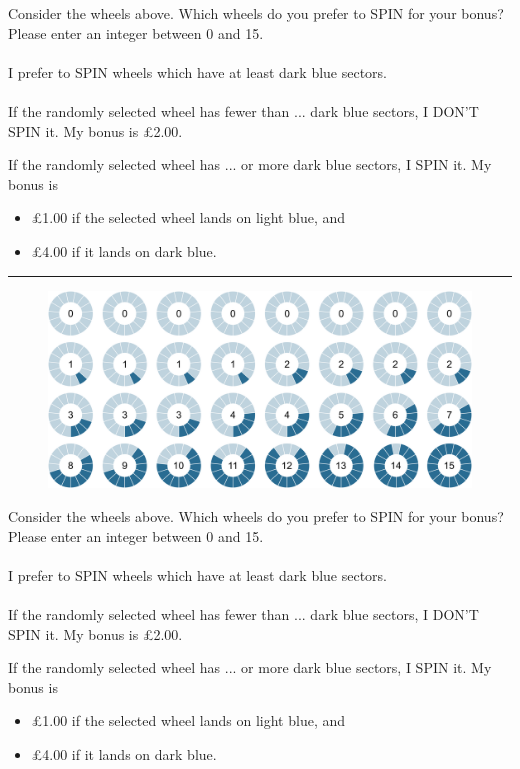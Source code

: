 \documentclass[pdftex,12pt, a4paper]{article}
\begin{document}
\noindent Consider the wheels above.
Which wheels do you prefer to SPIN for your bonus?\\
{\small Please enter an integer between 0 and 15.} \\
\\
\noindent I prefer to SPIN wheels which have at least \framebox[0.1\textwidth]{\rule{0pt}{15pt}} dark blue sectors.\\
\\
\noindent If the randomly selected wheel has fewer than ... dark blue sectors, I DON'T SPIN it.
My bonus is £2.00.

\noindent If the randomly selected wheel has ... or more dark blue sectors, I SPIN it.
My bonus is
\begin{itemize}
\item £1.00 if the selected wheel lands on light blue, and
\item £4.00 if it lands on dark blue.
\end{itemize}

\noindent \rule{\linewidth}{0.4pt}

\newpage
\begin{figure}[h!]
	\centering
	{\includegraphics[width=\linewidth]{Fig9_Right_15.pdf}}
\end{figure}

\noindent Consider the wheels above.
Which wheels do you prefer to SPIN for your bonus?\\
{\small Please enter an integer between 0 and 15.} \\
\\
\noindent I prefer to SPIN wheels which have at least \framebox[0.1\textwidth]{\rule{0pt}{15pt}} dark blue sectors.\\
\\
\noindent If the randomly selected wheel has fewer than ... dark blue sectors, I DON'T SPIN it.
My bonus is £2.00.

\noindent If the randomly selected wheel has ... or more dark blue sectors, I SPIN it.
My bonus is
\begin{itemize}
\item £1.00 if the selected wheel lands on light blue, and
\item £4.00 if it lands on dark blue.
\end{itemize}
\end{document}
